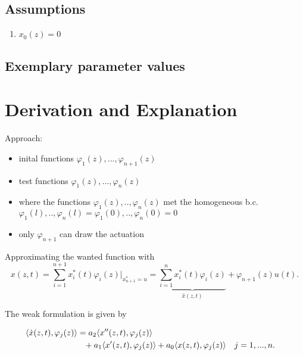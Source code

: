 \documentclass[10pt,a4paper]{article}
\begin{document}
	
	
	\subsection{Assumptions} %
		\begin{enumerate} %
			\item $x_0(z)=0$
		\end{enumerate}
	
	
	\subsection{Exemplary parameter values}
	

	
	\section{Derivation and Explanation} %
	Approach: 
	\begin{itemize}
		\item inital functions $\varphi_1(z),...,\varphi_{n+1}(z)$
		\item test functions $\varphi_1(z),...,\varphi_n(z)$
		\item where the functions $\varphi_1(z),..,\varphi_n(z)$ met the homogeneous b.c.\\
			$\varphi_1(l),..,\varphi_n(l)=\varphi_1(0),..,\varphi_n(0)=0$
		\item only $\varphi_{n+1}$ can draw the actuation
	\end{itemize}
	Approximating the wanted function with
	\begin{equation*}
		x(z,t) = \sum_{i=1}^{n+1} x_i^*(t) \varphi_i(z)\Big|_{x^*_{n+1}=u} =  \underbrace{\sum_{i=1}^{n} x_i^*(t) \varphi_i(z)}_{\hat x(z,t)} + \varphi_{n+1}(z) u(t).
	\end{equation*}

	\noindent The weak formulation is given by

	\begin{align*}
		\langle\dot{x}(z,t),\varphi_j(z)\rangle &=
		a_2 \langle x''(z,t),\varphi_j(z)\rangle \\
		&\hphantom =+
		a_1 \langle x'(z,t), \varphi_j(z)\rangle  +
		a_0 \langle x(z,t), \varphi_j(z)\rangle && j=1,...,n.
	\end{align*}
\end{document}
